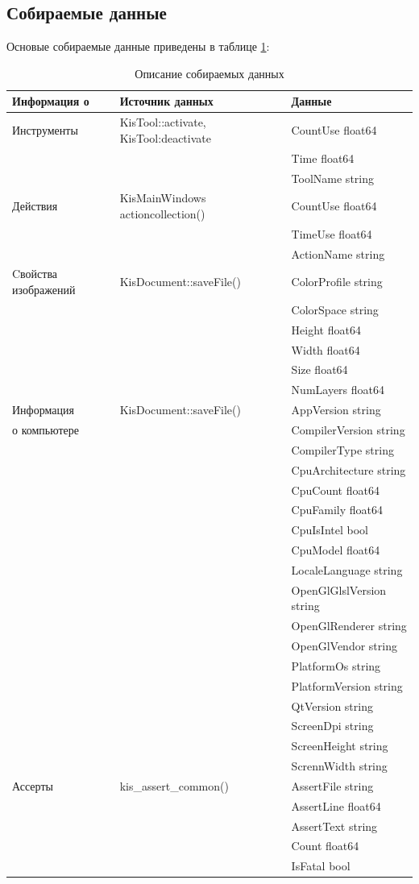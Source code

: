 \subsection{Собираемые данные}
Основые собираемые данные приведены в таблице \ref{tab:collectdata}:
\begin{table}[h]
	\caption{\label{tab:collectdata}Описание собираемых данных}
	\begin{center}
		\begin{tabular}{|l|l|l|}
			\hline
			Информация о & Источник данных & Данные \\
			\hline \hline
			Инструменты & KisTool::activate, KisTool:deactivate & 
			CountUse float64 
			 \tabularnewline & & Time     float64 
			 \tabularnewline & & ToolName string \\
		
			\hline
			Действия & 
			KisMainWindows actioncollection()
			 & 
			CountUse float64 
			\tabularnewline & & TimeUse      float64 
			\tabularnewline & & ActionName string \\
			
			\hline
			Cвойства изображений & 
			KisDocument::saveFile()
			& 
			ColorProfile string 
			\tabularnewline & &  ColorSpace   string 
			\tabularnewline & & Height       float64 
			\tabularnewline & & Width      float64
			\tabularnewline & & Size      float64 
			\tabularnewline & & NumLayers      float64  \\

			\hline
		Информация  &
			KisDocument::saveFile()	& 
			AppVersion string 
			\tabularnewline о компьютере & &  CompilerVersion   string 
			\tabularnewline & & CompilerType      string 
			\tabularnewline & & CpuArchitecture      string
			\tabularnewline & & CpuCount     float64 
			\tabularnewline & & CpuFamily      float64  
			\tabularnewline & & CpuIsIntel    bool 
			\tabularnewline & & CpuModel      float64  
			\tabularnewline & & LocaleLanguage      string
			\tabularnewline & & OpenGlGlslVersion     string
			\tabularnewline & & OpenGlRenderer     string   
			\tabularnewline & & OpenGlVendor    string 
			\tabularnewline & & PlatformOs    string 
			\tabularnewline & & PlatformVersion    string 
			\tabularnewline & & QtVersion    string    
			\tabularnewline & & ScreenDpi    string 
			\tabularnewline & & ScreenHeight    string
			\tabularnewline & & ScrennWidth    string      \\            
				\hline
				Ассерты &
				kis\_assert\_common()	& 
				AssertFile string
				\tabularnewline & &  AssertLine float64
			 \tabularnewline & & 	AssertText string
			 \tabularnewline & & 	Count float64
			 \tabularnewline & & 	IsFatal bool \\
			\hline
		\end{tabular}
	\end{center}
	\end{table}
